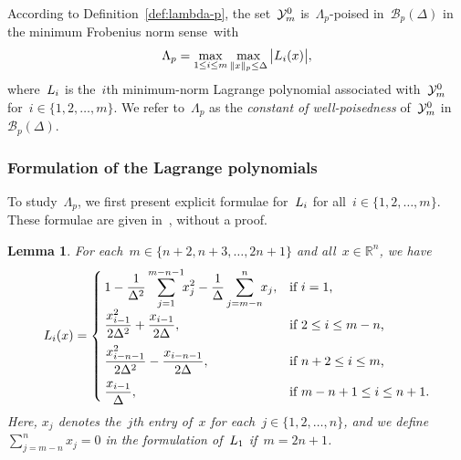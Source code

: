 \documentclass{article}
\numberwithin{equation}{section}
\theoremstyle{definition}
\theoremstyle{plain}
\newtheorem{lemma}{Lemma}[section]
\theoremstyle{remark}
\newcommand*{\abs}[2][]{#1\lvert#2#1\rvert}
\newcommand*{\lagp}[1][]{L\ifblank{#1}{}{_{#1}}}
\newcommand*{\norm}[2][]{#1\lVert#2#1\rVert}
\newcommand*{\R}{\mathbb{R}}
\newcommand*{\set}[2][]{#1\{#2#1\}}
\newcommand*{\xpt}[1][]{\mathcal{Y}\ifblank{#1}{}{^{#1}}}
\begin{document}
According to Definition~\ref{def:lambda-p}, the set~$\xpt[0]_m$ is~$\Lambda_p$-poised in~$\mathcal{B}_p(\Delta)$ in the minimum Frobenius norm sense~with
\begin{equation}
    \label{eq:Lambdap}
    \Lambda_p = \max_{1 \le i \le m} \max_{\norm{x}_p \le \Delta} \abs[\big]{\lagp[i](x)},
\end{equation}
where~$\lagp[i]$ is the~$i$th minimum-norm Lagrange polynomial associated with~$\xpt[0]_m$ for~$i \in \set{1, 2, \dots, m}$.
We refer to~$\Lambda_p$ as the \emph{constant of well-poisedness} of~$\xpt[0]_m$ in~$\mathcal{B}_p(\Delta)$.

\subsubsection{Formulation of the Lagrange polynomials}

To study~$\Lambda_p$, we first present explicit formulae for~$\lagp[i]$ for all~$i \in \set{1, 2, \dots, m}$.
These formulae are given in~\cite[\S~3]{Powell_2006}, without a proof.

\begin{lemma}
    \label{lem:lagp}
    For each~$m \in \set{n + 2, n + 3, \dots,  2n + 1}$ and all~$x \in \R^n$, we have
    \begin{equation*}
        \lagp[i](x) =
        \begin{cases}
            \displaystyle 1 - \frac{1}{\Delta^2} \sum_{j = 1}^{m - n - 1} \!\! x_j^2 - \frac{1}{\Delta} \sum_{j = m - n}^n \!\! x_j,    & \text{if~$i = 1$,}\\[2ex]
            \displaystyle \frac{x_{i - 1}^2}{2\Delta^2} + \frac{x_{i - 1}}{2\Delta},                                                    & \text{if~$2 \le i \le m - n$,}\\[2ex]
            \displaystyle \frac{x_{i -n - 1}^2}{2\Delta^2} - \frac{x_{i -n- 1}}{2\Delta},                                               & \text{if~$n+2\le i \le m$,}\\[2ex]
            \displaystyle \frac{x_{i - 1}}{\Delta},                                                                                     & \text{if~$m - n + 1 \le i \le n + 1$.}
        \end{cases}
    \end{equation*}
    Here, $x_j$ denotes the~$j$th entry of~$x$ for each~$j\in\{1,2, \dots, n\}$, and we define~$\sum_{j = m - n}^n x_j = 0$ in the
    formulation of~$\lagp[1]$ if~$m = 2n+1$.
\end{lemma}
\end{document}
